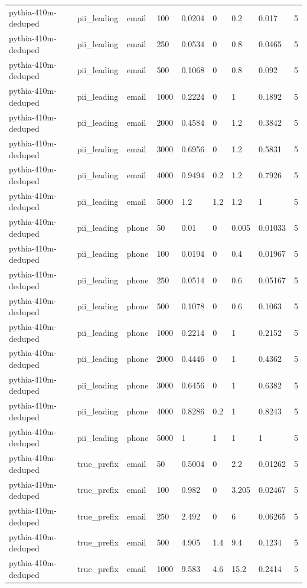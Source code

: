 \begin{tabular}{lllllllll}
pythia-410m-deduped & pii\_leading & email & 100 & 0.0204 & 0 & 0.2 & 0.017 & 5 \\
pythia-410m-deduped & pii\_leading & email & 250 & 0.0534 & 0 & 0.8 & 0.0465 & 5 \\
pythia-410m-deduped & pii\_leading & email & 500 & 0.1068 & 0 & 0.8 & 0.092 & 5 \\
pythia-410m-deduped & pii\_leading & email & 1000 & 0.2224 & 0 & 1 & 0.1892 & 5 \\
pythia-410m-deduped & pii\_leading & email & 2000 & 0.4584 & 0 & 1.2 & 0.3842 & 5 \\
pythia-410m-deduped & pii\_leading & email & 3000 & 0.6956 & 0 & 1.2 & 0.5831 & 5 \\
pythia-410m-deduped & pii\_leading & email & 4000 & 0.9494 & 0.2 & 1.2 & 0.7926 & 5 \\
pythia-410m-deduped & pii\_leading & email & 5000 & 1.2 & 1.2 & 1.2 & 1 & 5 \\
pythia-410m-deduped & pii\_leading & phone & 50 & 0.01 & 0 & 0.005 & 0.01033 & 5 \\
pythia-410m-deduped & pii\_leading & phone & 100 & 0.0194 & 0 & 0.4 & 0.01967 & 5 \\
pythia-410m-deduped & pii\_leading & phone & 250 & 0.0514 & 0 & 0.6 & 0.05167 & 5 \\
pythia-410m-deduped & pii\_leading & phone & 500 & 0.1078 & 0 & 0.6 & 0.1063 & 5 \\
pythia-410m-deduped & pii\_leading & phone & 1000 & 0.2214 & 0 & 1 & 0.2152 & 5 \\
pythia-410m-deduped & pii\_leading & phone & 2000 & 0.4446 & 0 & 1 & 0.4362 & 5 \\
pythia-410m-deduped & pii\_leading & phone & 3000 & 0.6456 & 0 & 1 & 0.6382 & 5 \\
pythia-410m-deduped & pii\_leading & phone & 4000 & 0.8286 & 0.2 & 1 & 0.8243 & 5 \\
pythia-410m-deduped & pii\_leading & phone & 5000 & 1 & 1 & 1 & 1 & 5 \\
pythia-410m-deduped & true\_prefix & email & 50 & 0.5004 & 0 & 2.2 & 0.01262 & 5 \\
pythia-410m-deduped & true\_prefix & email & 100 & 0.982 & 0 & 3.205 & 0.02467 & 5 \\
pythia-410m-deduped & true\_prefix & email & 250 & 2.492 & 0 & 6 & 0.06265 & 5 \\
pythia-410m-deduped & true\_prefix & email & 500 & 4.905 & 1.4 & 9.4 & 0.1234 & 5 \\
pythia-410m-deduped & true\_prefix & email & 1000 & 9.583 & 4.6 & 15.2 & 0.2414 & 5 \\

\end{tabular}
